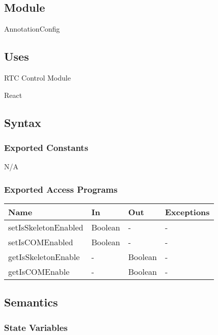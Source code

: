 \documentclass[12pt, titlepage]{article}
\begin{document}
\subsection{Module}

AnnotationConfig

\subsection{Uses}

\noindent RTC Control Module

\noindent React

\subsection{Syntax}

\subsubsection{Exported Constants}

N/A

\subsubsection{Exported Access Programs}

\begin{center}
  \begin{tabular}{p{4cm} p{4cm} p{4cm} p{2cm}}
    \hline
    \textbf{Name}              & \textbf{In}   & \textbf{Out}  & \textbf{Exceptions} \\
    \hline
    setIsSkeletonEnabled & Boolean & -       & -             \\
    setIsCOMEnabled      & Boolean & -       & -             \\
    getIsSkeletonEnable  & -       & Boolean & -             \\
    getIsCOMEnable       & -       & Boolean & -             \\
    \hline
  \end{tabular}
\end{center}

\subsection{Semantics}

\subsubsection{State Variables}
\end{document}
